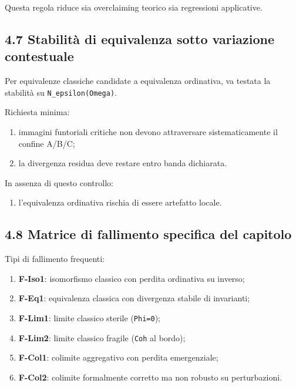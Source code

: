 Questa regola riduce sia overclaiming teorico sia regressioni applicative.

\subsection{4.7 Stabilità di equivalenza sotto variazione contestuale}

Per equivalenze classiche candidate a equivalenza ordinativa, va testata la stabilità su \texttt{N\_epsilon(Omega)}.

Richiesta minima:

\begin{enumerate}
\def\labelenumi{\arabic{enumi}.}
\tightlist
\item
  immagini funtoriali critiche non devono attraversare sistematicamente il confine A/B/C;
\item
  la divergenza residua deve restare entro banda dichiarata.
\end{enumerate}

In assenza di questo controllo:

\begin{enumerate}
\def\labelenumi{\arabic{enumi}.}
\tightlist
\item
  l'equivalenza ordinativa rischia di essere artefatto locale.
\end{enumerate}

\subsection{4.8 Matrice di fallimento specifica del capitolo}

Tipi di fallimento frequenti:

\begin{enumerate}
\def\labelenumi{\arabic{enumi}.}
\tightlist
\item
  \textbf{F-Iso1}: isomorfismo classico con perdita ordinativa su inverso;
\item
  \textbf{F-Eq1}: equivalenza classica con divergenza stabile di invarianti;
\item
  \textbf{F-Lim1}: limite classico sterile (\texttt{Phi=0});
\item
  \textbf{F-Lim2}: limite classico fragile (\texttt{Coh} al bordo);
\item
  \textbf{F-Col1}: colimite aggregativo con perdita emergenziale;
\item
  \textbf{F-Col2}: colimite formalmente corretto ma non robusto su perturbazioni.
\end{enumerate}

